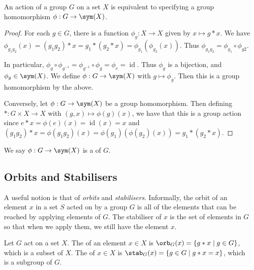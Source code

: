 \begin{proposition}
	An action of a group $G$ on a set $X$ is equivalent to specifying a group homomorphism $\phi: G \rightarrow \sym(X)$.
\end{proposition}
\begin{proof}
	For each $g \in G$, there is a function $\phi_g : X \rightarrow X$ given by $x \mapsto g * x$. We have $\phi_{g_1 g_2}(x) = (g_1 g_2) * x = g_1 * (g_2 * x) = \phi_{g_1} (\phi_{g_2}(x))$. Thus $\phi_{g_1 g_2} = \phi_{g_1} \circ \phi_{g2}$.
	
	In particular, $\phi_g \circ \phi_{g^{-1}} = \phi_{g^{-1}} \circ \phi_g = \phi_e = \operatorname{id}$. Thus $\phi_g$ is a bijection, and $\phi_g \in \sym(X)$. We define $\phi : G \rightarrow \sym(X)$ with $g \mapsto \phi_g$. Then this is a group homomorphism by the above.
	
	Conversely, let $\phi : G \rightarrow \sym(X)$ be a group homomorphism. Then defining $*: G \times X \rightarrow X$ with $(g, x) \mapsto \phi(g)(x)$, we have that this is a group action since $e * x = \phi(e)(x) = \operatorname{id}(x) = x$ and $(g_1 g_2) * x = \phi(g_1 g_2)(x) = \phi(g_1)(\phi(g_2)(x)) = g_1 * (g_2 * x)$.
\end{proof}

\begin{definition}
	We say $\phi: G \rightarrow \sym(X)$ is a  of $G$.
\end{definition}

\subsection{Orbits and Stabilisers}

A useful notion is that of \emph{orbits} and \emph{stabilisers}. Informally, the orbit of an element $x$ in a set $S$ acted on by a group $G$ is all of the elements that can be reached by applying elements of $G$. The stabiliser of $x$ is the set of elements in $G$ so that when we apply them, we still have the element $x$.

\begin{definition}
	Let $G$ act on a set $X$. The  of an element $x \in X$ is $\orb_G(x) = \{ g * x \mid g \in G \}$, which is a subset of $X$. The  of $x \in X$ is $\stab_G(x) = \{ g \in G \mid g * x = x \}$, which is a subgroup of $G$.
\end{definition}

